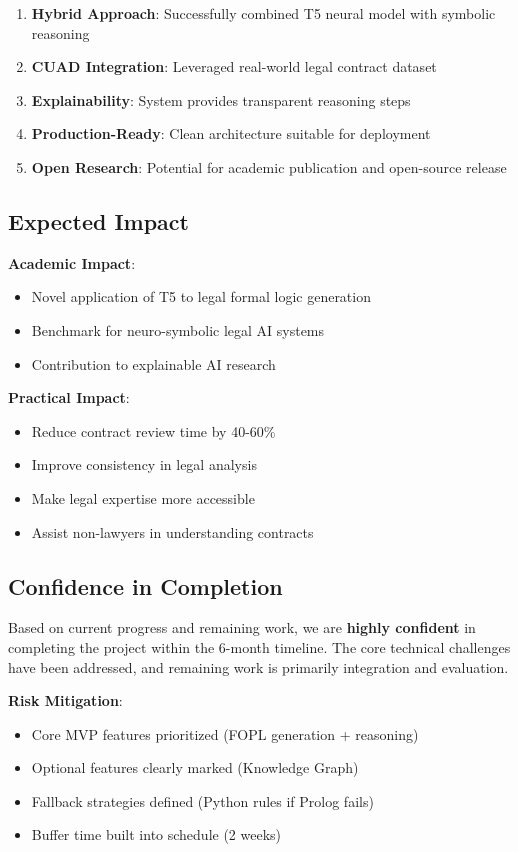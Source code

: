 \documentclass[12pt,a4paper]{article}
\begin{document}
\begin{enumerate}
    \item \textbf{Hybrid Approach}: Successfully combined T5 neural model with symbolic reasoning
    \item \textbf{CUAD Integration}: Leveraged real-world legal contract dataset
    \item \textbf{Explainability}: System provides transparent reasoning steps
    \item \textbf{Production-Ready}: Clean architecture suitable for deployment
    \item \textbf{Open Research}: Potential for academic publication and open-source release
\end{enumerate}

\subsection{Expected Impact}

\textbf{Academic Impact}:
\begin{itemize}
    \item Novel application of T5 to legal formal logic generation
    \item Benchmark for neuro-symbolic legal AI systems
    \item Contribution to explainable AI research
\end{itemize}

\textbf{Practical Impact}:
\begin{itemize}
    \item Reduce contract review time by 40-60\%
    \item Improve consistency in legal analysis
    \item Make legal expertise more accessible
    \item Assist non-lawyers in understanding contracts
\end{itemize}

\subsection{Confidence in Completion}

Based on current progress and remaining work, we are \textbf{highly confident} in completing the project within the 6-month timeline. The core technical challenges have been addressed, and remaining work is primarily integration and evaluation.

\textbf{Risk Mitigation}:
\begin{itemize}
    \item Core MVP features prioritized (FOPL generation + reasoning)
    \item Optional features clearly marked (Knowledge Graph)
    \item Fallback strategies defined (Python rules if Prolog fails)
    \item Buffer time built into schedule (2 weeks)
\end{itemize}
\end{document}
